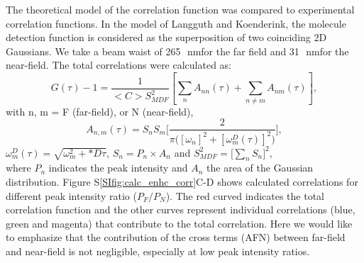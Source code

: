 \documentclass[11pt,a4paper,onecolumn]{article}
\newcommand{\nm}{\ensuremath{\,\textrm{nm}}}
\begin{document}
The theoretical model of the correlation function was compared to experimental correlation functions. In the model of 
Langguth and Koenderink\cite{langguth2016exact}, the molecule detection function is considered as the superposition of 
two coinciding 2D Gaussians. We take a beam waist of 265~\nm for the far field and 31~\nm for the near-field. 
The total correlations were calculated as:
\begin{equation}
	G(\tau)-1 = \frac{1}{<C>S_{MDF}^2}[\sum_{n}A_{nn}(\tau) + \sum_{n\neq m}A_{nm}(\tau)],
	\label{eq:far-near-gauss}
\end{equation}
with n, m = F (far-field), or N (near-field),
\begin{equation}
	A_{n,m}(\tau)=S_nS_m\Bigg[\frac{2}{\pi\Big([\omega_n]^2 + [\omega_m^D(\tau)]^2 \Big)}\Bigg] ,
	\label{eq:area-gauss}
\end{equation}
$\omega_m^D(\tau)=\sqrt{\omega_m^2 + *D\tau}$, $S_n=P_n\times A_n$ and $S_{MDF}^2=\Big[\sum_{n}S_n\Big]^2$,\\
where $P_n$ indicates the peak intensity and $A_n$ the area of the Gaussian distribution. 
Figure S\ref{SIfig:calc_enhc_corr}C-D shows calculated correlations for different peak intensity ratio ($P_F/P_N$). 
The red curved indicates the total correlation function and the other curves represent individual correlations 
(blue, green and magenta) that contribute to the total correlation. Here we would like to emphasize that the 
contribution of the cross terms (AFN) between far-field and near-field is not negligible, especially at low peak 
intensity ratios.
\end{document}
